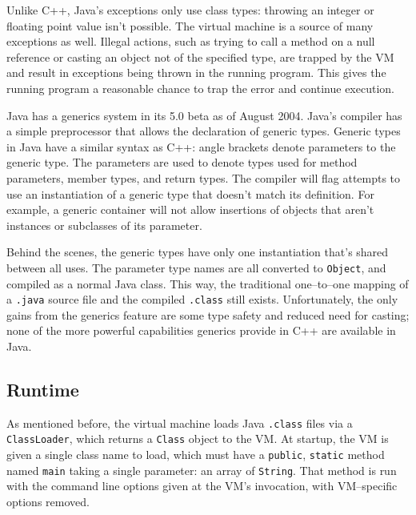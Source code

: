 	Unlike C++, Java's exceptions only use class types: throwing an integer or floating point value isn't possible.  The virtual machine is a source of many exceptions as well.  Illegal actions, such as trying to call a method on a null reference or casting an object not of the specified type, are trapped by the VM and result in exceptions being thrown in the running program.  This gives the running program a reasonable chance to trap the error and continue execution.

  Java has a generics system in its 5.0 beta as of August 2004\cite{java-generics}.  Java's compiler has a simple preprocessor that allows the declaration of generic types.  Generic types in Java have a similar syntax as C++: angle brackets denote parameters to the generic type.  The parameters are used to denote types used for method parameters, member types, and return types.  The compiler will flag attempts to use an instantiation of a generic type that doesn't match its definition.  For example, a generic container will not allow insertions of objects that aren't instances or subclasses of its parameter.

  Behind the scenes, the generic types have only one instantiation that's shared between all uses.  The parameter type names are all converted to \texttt{Object}, and compiled as a normal Java class.  This way, the traditional one--to--one mapping of a \texttt{.java} source file and the compiled \texttt{.class} still exists.  Unfortunately, the only gains from the generics feature are some type safety and reduced need for casting; none of the more powerful capabilities generics provide in C++ are available in Java.


\subsection{Runtime}
	As mentioned before, the virtual machine loads Java \texttt{.class} files via a \texttt{ClassLoader}, which returns a \texttt{Class} object to the VM.  At startup, the VM is given a single class name to load, which must have a \texttt{public}, \texttt{static} method named \texttt{main} taking a single parameter: an array of \texttt{String}.  That method is run with the command line options given at the VM's invocation, with VM--specific options removed.

